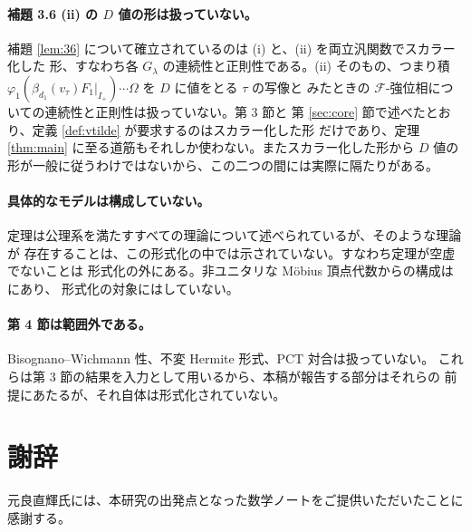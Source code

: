 \documentclass[11pt,a4paper]{article}
\newcommand{\Fields}{\mathcal{F}}
\newcommand{\Dom}{D}
\theoremstyle{definition}
\begin{document}
\paragraph{\texorpdfstring{補題 3.6 (ii) の $\Dom$ 値の形は扱っていない。}{補題 3.6 (ii) の D 値の形は扱っていない。}}
補題 \ref{lem:36} について確立されているのは (i) と、(ii) を両立汎関数でスカラー化した
形、すなわち各 $G_\lambda$ の連続性と正則性である。(ii) そのもの、つまり積
$\varphi_1(\beta_{d_1}(v_\tau)F_1|_{I_+})\cdots\Omega$ を $\Dom$ に値をとる $\tau$ の写像と
みたときの $\Fields$-強位相についての連続性と正則性は扱っていない。第 3 節と
第 \ref{sec:core} 節で述べたとおり、定義 \ref{def:vtilde} が要求するのはスカラー化した形
だけであり、定理 \ref{thm:main} に至る道筋もそれしか使わない。またスカラー化した形から
$\Dom$ 値の形が一般に従うわけではないから、この二つの間には実際に隔たりがある。

\paragraph{具体的なモデルは構成していない。}
定理は公理系を満たすすべての理論について述べられているが、そのような理論が
存在することは、この形式化の中では示されていない。すなわち定理が空虚でないことは
形式化の外にある。非ユニタリな M\"obius 頂点代数からの構成は \cite{CRTT25} にあり、
形式化の対象にはしていない。

\paragraph{\texorpdfstring{\cite{T26}}{[T26]} 第 4 節は範囲外である。}
Bisognano--Wichmann 性、不変 Hermite 形式、PCT 対合は扱っていない。
これらは第 3 節の結果を入力として用いるから、本稿が報告する部分はそれらの
前提にあたるが、それ自体は形式化されていない。

\section*{謝辞}
元良直輝氏には、本研究の出発点となった数学ノートをご提供いただいたことに感謝する。
\end{document}

